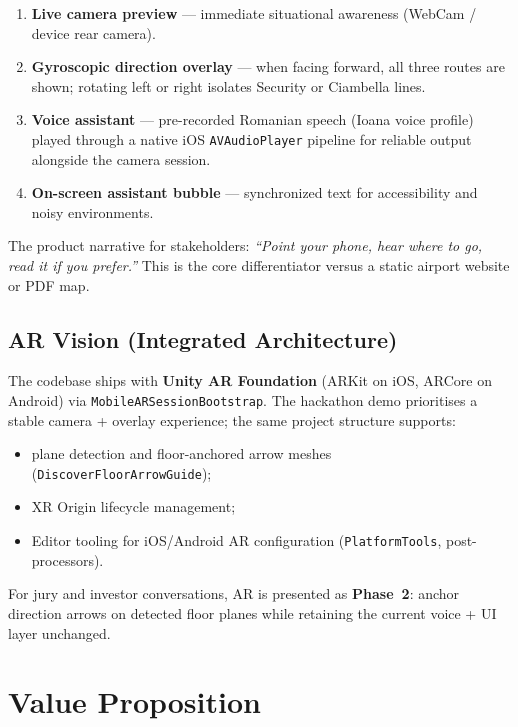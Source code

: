 \documentclass[11pt,a4paper]{article}
\begin{document}
\begin{enumerate}[label=\arabic*.]
    \item \textbf{Live camera preview} --- immediate situational awareness (WebCam / device rear camera).
    \item \textbf{Gyroscopic direction overlay} --- when facing forward, all three routes are shown; rotating left or right isolates Security or Ciambella lines.
    \item \textbf{Voice assistant} --- pre-recorded Romanian speech (Ioana voice profile) played through a native iOS \texttt{AVAudioPlayer} pipeline for reliable output alongside the camera session.
    \item \textbf{On-screen assistant bubble} --- synchronized text for accessibility and noisy environments.
\end{enumerate}

\begin{techbox}
The product narrative for stakeholders: \emph{``Point your phone, hear where to go, read it if you prefer.''} This is the core differentiator versus a static airport website or PDF map.
\end{techbox}

\subsection{AR Vision (Integrated Architecture)}

The codebase ships with \textbf{Unity AR Foundation} (ARKit on iOS, ARCore on Android) via \texttt{MobileARSessionBootstrap}. The hackathon demo prioritises a stable camera + overlay experience; the same project structure supports:

\begin{itemize}
    \item plane detection and floor-anchored arrow meshes (\texttt{DiscoverFloorArrowGuide});
    \item XR Origin lifecycle management;
    \item Editor tooling for iOS/Android AR configuration (\texttt{PlatformTools}, post-processors).
\end{itemize}

For jury and investor conversations, AR is presented as \textbf{Phase~2}: anchor direction arrows on detected floor planes while retaining the current voice + UI layer unchanged.

\section{Value Proposition}
\end{document}
